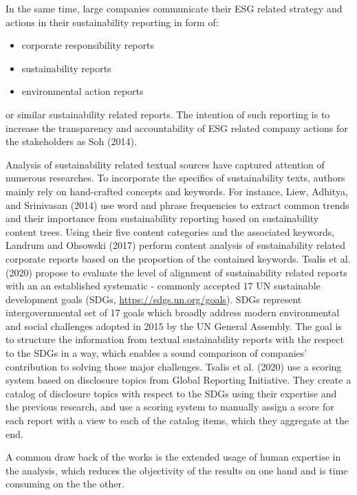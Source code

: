 \documentclass[
]{article}
\begin{document}
In the same time, large companies communicate their ESG related strategy and actions in their sustainability reporting in form of:

\begin{itemize}
\item
  corporate responsibility reports
\item
  sustainability reports
\item
  environmental action reports
\end{itemize}

or similar sustainability related reports. The intention of such reporting is to increase the transparency and accountability of ESG related company actions for the stakeholders as Soh (2014).

Analysis of sustainability related textual sources have captured attention of numerous researches. To incorporate the specifics of sustainability texts, authors mainly rely on hand-crafted concepts and keywords. For instance, Liew, Adhitya, and Srinivasan (2014) use word and phrase frequencies to extract common trends and their importance from sustainability reporting based on sustainability content trees. Using their five content categories and the associated keywords, Landrum and Ohsowski (2017) perform content analysis of sustainability related corporate reports based on the proportion of the contained keywords.
Tsalis et al. (2020) propose to evaluate the level of alignment of sustainability related reports with an an established systematic - commonly accepted 17 UN sustainable development goals (SDGs, \url{https://sdgs.un.org/goals}). SDGs represent intergovernmental set of 17 goals which broadly address modern environmental and social challenges adopted in 2015 by the UN General Assembly. The goal is to structure the information from textual sustainability reports with the respect to the SDGs in a way, which enables a sound comparison of companies' contribution to solving those major challenges. Tsalis et al. (2020) use a scoring system based on disclosure topics from Global Reporting Initiative. They create a catalog of disclosure topics with respect to the SDGs using their expertise and the previous research, and use a scoring system to manually assign a score for each report with a view to each of the catalog items, which they aggregate at the end.

A common draw back of the works is the extended usage of human expertise in the analysis, which reduces the objectivity of the results on one hand and is time consuming on the the other.
\end{document}
